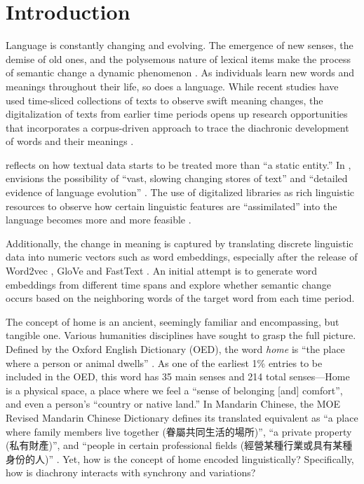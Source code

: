 

\chapter{Introduction}
Language is constantly changing and evolving. The emergence of new senses, the demise of old ones, and the polysemous nature of lexical items make the process of semantic change a dynamic phenomenon \parencite{robertinvanhove2008}. As individuals learn new words and meanings throughout their life, so does a language. While recent studies have used time-sliced collections of texts to observe swift meaning changes, the digitalization of texts from earlier time periods opens up research opportunities that incorporates a corpus-driven approach to trace the diachronic development of words and their meanings \parencite{kutuzov2018survey,tahmasebi2018survey,camacho2018survey}.

\textcite{renouf2002time} reflects on how textual data starts to be treated more than ``a static entity.'' In \cite*{sinclair1982reflections}, \citeauthor{sinclair1982reflections} envisions the possibility of ``vast, slowing changing stores of text'' and ``detailed evidence of language evolution'' . The use of digitalized libraries as rich linguistic resources to observe how certain linguistic features are ``assimilated'' into the language becomes more and more feasible \parencite{renouf2002time}.

Additionally, the change in meaning is captured by translating discrete linguistic data into numeric vectors such as word embeddings, especially after the release of Word2vec \parencite{mikolov2013efficient}, GloVe \parencite{pennington2014glove} and FastText \parencite{bojanowski2016enriching}. An initial attempt is to generate word embeddings from different time spans and explore whether semantic change occurs based on the neighboring words of the target word from each time period.

The concept of home is an ancient, seemingly familiar and encompassing, but tangible one. Various humanities disciplines have sought to grasp the full picture. Defined by the Oxford English Dictionary (OED), the word \textit{home} is ``the place where a person or animal dwells'' . As one of the earliest 1\% entries to be included in the OED, this word has 35 main senses and 214 total senses—Home is a physical space, a place where we feel a ``sense of belonging [and] comfort'', and even a person's ``country or native land.'' In Mandarin Chinese, the MOE Revised Mandarin Chinese Dictionary defines its translated equivalent  as ``a place where family members live together (眷屬共同生活的場所)'', ``a private property (私有財產)'', and ``people in certain professional fields (經營某種行業或具有某種身份的人)'' . Yet, how is the concept of home encoded linguistically? Specifically, how is diachrony interacts with synchrony and variations?

